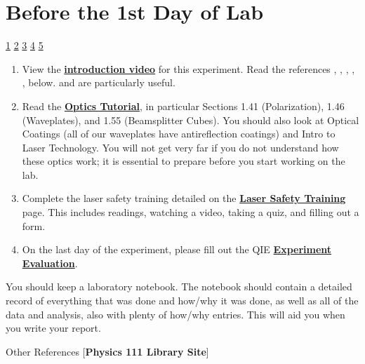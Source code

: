 \documentclass{../lab}
\begin{document}
\section{Before the 1st Day of Lab}

\signatures \hyperlink{Blue Beam Path}{1} \hyperlink{Angle}{2} \hyperlink{Infrared Beam Path}{3} \hyperlink{Arbitrary Offset}{4} \hyperlink{$C_1$, $C_2$, and $\phi$}{5} 

\begin{enumerate}
    \item View the \href{https://berkeley-physics111b.github.io/assets/pdf/oldwebsitestructure/QIE/qie\_introduction\_final2.mp4}{\textbf{introduction video}} for this experiment. Read the references \cite{Dehlinger}, \cite{Bell}, \cite{Clauser}, \cite{Walborn}, \cite{Lukishova}, \cite{Fox} below. \cite{Dehlinger} and \cite{Lukishova} are particularly useful.

    \item Read the \href{https://berkeley-physics111b.github.io/assets/pdf/oldwebsitestructure/QIE/fundamental-Optics.pdf}{\textbf{Optics Tutorial}}, in particular Sections 1.41 (Polarization), 1.46 (Waveplates), and 1.55 (Beamsplitter Cubes). You should also look at Optical Coatings (all of our waveplates have antireflection coatings) and Intro to Laser Technology. You will not get very far if you do not understand how these optics work; it is essential to prepare before you start working on the lab.

    \item Complete the laser safety training detailed on the \href{https://berkeley-physics111b.github.io/safety/laser/}{\textbf{Laser Safety Training}} page. This includes readings, watching a video, taking a quiz, and filling out a form.

    \item On the last day of the experiment, please fill out the QIE \href{\ExperimentEvaluation}{\textbf{Experiment Evaluation}}.

\end{enumerate}

You should keep a laboratory notebook. The notebook should contain a detailed record of everything that was done and how/why it was done, as well as all of the data and analysis, also with plenty of how/why entries. This will aid you when you write your report.

Other References [\textbf{Physics 111 Library Site}]
\end{document}
